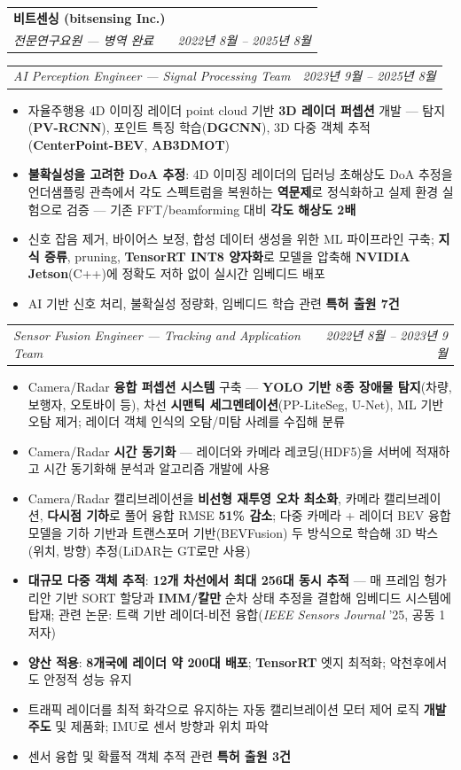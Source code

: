 \documentclass[a4paper,11pt]{article}
\makeatletter
\newcommand{\resumeItem}[1]{\item\small{{#1 \vspace{-2pt}}}}
\newcommand{\resumeSubheading}[4]{
  \vspace{-2pt}\item
    \begin{tabular*}{0.97\textwidth}[t]{l@{\extracolsep{\fill}}r}
      \textbf{#1} & #2 \\
      \textit{\small#3} & \textit{\small #4} \\
    \end{tabular*}\vspace{-7pt}
}
\newcommand{\resumeSubSubheading}[2]{
    \item
    \begin{tabular*}{0.97\textwidth}{l@{\extracolsep{\fill}}r}
      \textit{\small#1} & \textit{\small #2} \\
    \end{tabular*}\vspace{-7pt}
}
\newcommand{\resumeItemListStart}{\begin{itemize}[itemsep=0pt]}
\newcommand{\resumeItemListEnd}{\end{itemize}\vspace{-5pt}}
\makeatother
\begin{document}
    \resumeSubheading
      {비트센싱 (bitsensing Inc.)}{}
      {전문연구요원 --- 병역 완료}{2022년 8월 -- 2025년 8월}
    \resumeSubSubheading
      {AI Perception Engineer --- Signal Processing Team}{2023년 9월 -- 2025년 8월}
      \resumeItemListStart
        \resumeItem{자율주행용 4D 이미징 레이더 point cloud 기반 \textbf{3D 레이더 퍼셉션} 개발 --- 탐지(\textbf{PV-RCNN}), 포인트 특징 학습(\textbf{DGCNN}), 3D 다중 객체 추적(\textbf{CenterPoint-BEV}, \textbf{AB3DMOT})}
        \resumeItem{\textbf{불확실성을 고려한 DoA 추정}: 4D 이미징 레이더의 딥러닝 초해상도 DoA 추정을 언더샘플링 관측에서 각도 스펙트럼을 복원하는 \textbf{역문제}로 정식화하고 실제 환경 실험으로 검증 --- 기존 FFT/beamforming 대비 \textbf{각도 해상도 2배}}
        \resumeItem{신호 잡음 제거, 바이어스 보정, 합성 데이터 생성을 위한 ML 파이프라인 구축; \textbf{지식 증류}, pruning, \textbf{TensorRT INT8 양자화}로 모델을 압축해 \textbf{NVIDIA Jetson}(C++)에 정확도 저하 없이 실시간 임베디드 배포}
        \resumeItem{AI 기반 신호 처리, 불확실성 정량화, 임베디드 학습 관련 \textbf{특허 출원 7건}}
      \resumeItemListEnd

    \resumeSubSubheading
      {Sensor Fusion Engineer --- Tracking and Application Team}{2022년 8월 -- 2023년 9월}
      \resumeItemListStart
        \resumeItem{Camera/Radar \textbf{융합 퍼셉션 시스템} 구축 --- \textbf{YOLO 기반 8종 장애물 탐지}(차량, 보행자, 오토바이 등), 차선 \textbf{시맨틱 세그멘테이션}(PP-LiteSeg, U-Net), ML 기반 오탐 제거; 레이더 객체 인식의 오탐/미탐 사례를 수집해 분류}
        \resumeItem{Camera/Radar \textbf{시간 동기화} --- 레이더와 카메라 레코딩(HDF5)을 서버에 적재하고 시간 동기화해 분석과 알고리즘 개발에 사용}
        \resumeItem{Camera/Radar 캘리브레이션을 \textbf{비선형 재투영 오차 최소화}, 카메라 캘리브레이션, \textbf{다시점 기하}로 풀어 융합 RMSE \textbf{51\% 감소}; 다중 카메라 + 레이더 BEV 융합 모델을 기하 기반과 트랜스포머 기반(BEVFusion) 두 방식으로 학습해 3D 박스(위치, 방향) 추정(LiDAR는 GT로만 사용)}
        \resumeItem{\textbf{대규모 다중 객체 추적}: \textbf{12개 차선에서 최대 256대 동시 추적} --- 매 프레임 헝가리안 기반 SORT 할당과 \textbf{IMM/칼만} 순차 상태 추정을 결합해 임베디드 시스템에 탑재; 관련 논문: 트랙 기반 레이더-비전 융합(\textit{IEEE Sensors Journal} '25, 공동 1저자)}
        \resumeItem{\textbf{양산 적용}: \textbf{8개국에 레이더 약 200대 배포}; \textbf{TensorRT} 엣지 최적화; 악천후에서도 안정적 성능 유지}
        \resumeItem{트래픽 레이더를 최적 화각으로 유지하는 자동 캘리브레이션 모터 제어 로직 \textbf{개발 주도} 및 제품화; IMU로 센서 방향과 위치 파악}
        \resumeItem{센서 융합 및 확률적 객체 추적 관련 \textbf{특허 출원 3건}}
      \resumeItemListEnd
\end{document}

